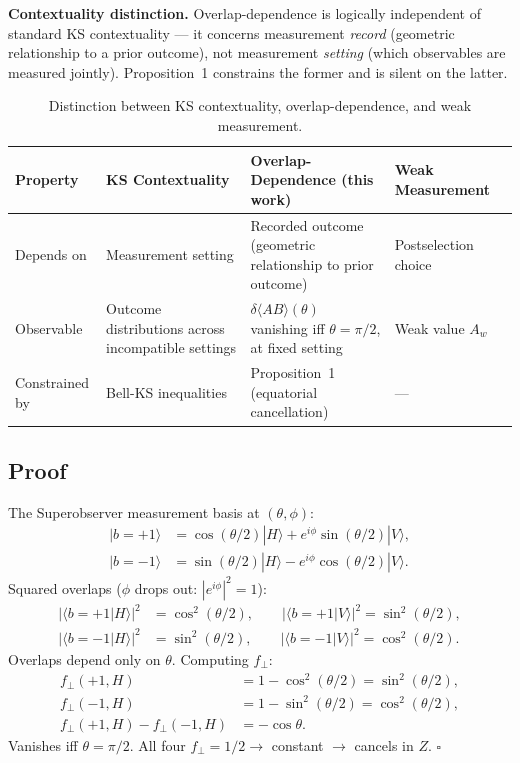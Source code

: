 \documentclass[twocolumn,aps,pra,superscriptaddress,floatfix,10pt]{revtex4-2}
\begin{document}
\textbf{Contextuality distinction.} Overlap-dependence is logically independent
of standard KS contextuality --- it concerns measurement \emph{record}
(geometric relationship to a prior outcome), not measurement \emph{setting}
(which observables are measured jointly). Proposition~1 constrains the
former and is silent on the latter.

\begin{table}[H]
\centering
\caption{Distinction between KS contextuality, overlap-dependence, and weak measurement.}
\label{tab:contextuality}
\begin{tabular}{p{}p{}p{}p{}}
\toprule
Property & KS Contextuality & Overlap-Dependence (this work) & Weak Measurement~\cite{Aharonov1988} \\
\midrule
Depends on & Measurement setting & Recorded outcome (geometric relationship to prior outcome) & Postselection choice \\
Observable & Outcome distributions across incompatible settings & $\delta\langle AB\rangle(\theta)$ vanishing iff $\theta = \pi/2$, at fixed setting & Weak value $A_w$ \\
Constrained by & Bell-KS inequalities & Proposition~1 (equatorial cancellation) & --- \\
\bottomrule
\end{tabular}
\end{table}

\subsection{Proof}
\label{sec:proof}

The Superobserver measurement basis at $(\theta, \phi)$:
\begin{align}
|b=+1\rangle &= \cos(\theta/2)|H\rangle + e^{i\phi}\sin(\theta/2)|V\rangle,
\label{eq:basis_p} \\
|b=-1\rangle &= \sin(\theta/2)|H\rangle - e^{i\phi}\cos(\theta/2)|V\rangle.
\label{eq:basis_m}
\end{align}
Squared overlaps ($\phi$ drops out: $|e^{i\phi}|^2 = 1$):
\begin{align}
|\langle b=+1|H\rangle|^2 &= \cos^2(\theta/2), \qquad
|\langle b=+1|V\rangle|^2 = \sin^2(\theta/2),
\label{eq:overlap_p} \\
|\langle b=-1|H\rangle|^2 &= \sin^2(\theta/2), \qquad
|\langle b=-1|V\rangle|^2 = \cos^2(\theta/2).
\label{eq:overlap_m}
\end{align}
Overlaps depend only on $\theta$. Computing $f_\perp$:
\begin{align}
f_\perp(+1, H) &= 1 - \cos^2(\theta/2) = \sin^2(\theta/2),
\label{eq:fp} \\
f_\perp(-1, H) &= 1 - \sin^2(\theta/2) = \cos^2(\theta/2),
\label{eq:fm} \\
f_\perp(+1, H) - f_\perp(-1, H) &= -\cos\theta.
\label{eq:diff}
\end{align}
Vanishes iff $\theta = \pi/2$. All four $f_\perp = 1/2 \to$ constant $\to$ cancels in $Z$. $\square$
\end{document}
